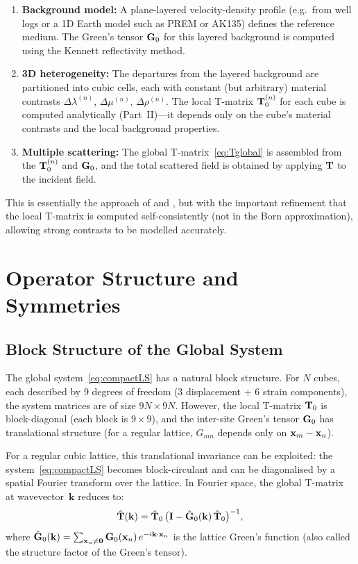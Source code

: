\begin{enumerate}
\item \textbf{Background model:}  A plane-layered velocity-density profile
  (e.g.\ from well logs or a 1D Earth model such as PREM or AK135) defines
  the reference medium.  The Green's tensor $\mathbf{G}_0$ for this layered
  background is computed using the Kennett reflectivity method.

\item \textbf{3D heterogeneity:}  The departures from the layered background
  are partitioned into cubic cells, each with constant (but arbitrary)
  material contrasts $\Delta\lambda^{(n)}$, $\Delta\mu^{(n)}$,
  $\Delta\rho^{(n)}$.  The local T-matrix $\mathbf{T}_0^{(n)}$ for each cube is
  computed analytically (Part~II)---it depends only on the cube's material
  contrasts and the local background properties.

\item \textbf{Multiple scattering:}  The global
  T-matrix~\eqref{eq:Tglobal} is assembled from the $\mathbf{T}_0^{(n)}$ and
  $\mathbf{G}_0$, and the total scattered field is obtained by applying $\mathbf{T}$ to
  the incident field.
\end{enumerate}
This is essentially the approach of \citet{Jakobsen2012} and
\citet{JakobsenWu2016}, but with the important refinement
that the local T-matrix is computed self-consistently (not in the Born
approximation), allowing strong contrasts to be modelled accurately.


\section{Operator Structure and Symmetries}

\subsection{Block Structure of the Global System}

The global system~\eqref{eq:compactLS} has a natural block structure.  For
$N$ cubes, each described by 9 degrees of freedom (3 displacement + 6
strain components), the system matrices are of size $9N\times 9N$.  However,
the local T-matrix $\mathbf{T}_0$ is block-diagonal (each block is $9\times 9$),
and the inter-site Green's tensor $\mathbf{G}_0$ has translational structure (for a
regular lattice, $G_{mn}$ depends only on $\mathbf{x}_m - \mathbf{x}_n$).

For a regular cubic lattice, this translational invariance can be exploited:
the system~\eqref{eq:compactLS} becomes block-circulant and can be
diagonalised by a spatial Fourier transform over the lattice.  In Fourier
space, the global T-matrix at wavevector~$\mathbf{k}$ reduces to:
\begin{equation}
  \hat{\mathbf{T}}(\mathbf{k})
  = \hat{\mathbf{T}}_0\,\bigl(\mathbf{I} - \hat{\mathbf{G}}_0(\mathbf{k})\,\hat{\mathbf{T}}_0\bigr)^{-1},
\label{eq:Tfourier}
\end{equation}
where $\hat{\mathbf{G}}_0(\mathbf{k})
= \sum_{\mathbf{x}_n\neq\mathbf{0}} \mathbf{G}_0(\mathbf{x}_n)\,e^{-i\mathbf{k}\cdot\mathbf{x}_n}$
is the lattice Green's function (also called the structure factor of the
Green's tensor).

